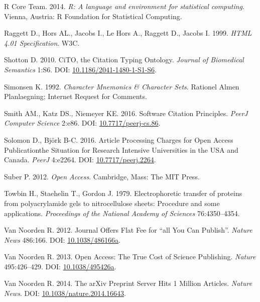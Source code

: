 \documentclass[10pt,fleqn]{wlpeerj}
\begin{document}
\hypertarget{ref-Rux5f2014}{}
R Core Team. 2014. \emph{R: A language and environment for statistical
computing}. Vienna, Austria: R Foundation for Statistical Computing.

\hypertarget{ref-HTML4}{}
Raggett D., Hors AL., Jacobs I., Le Hors A., Raggett D., Jacobs I. 1999.
\emph{HTML 4.01 Specification}. W3C.

\hypertarget{ref-shottonux5fcitoux5f2010}{}
Shotton D. 2010. CiTO, the Citation Typing Ontology. \emph{Journal of
Biomedical Semantics} 1:S6. DOI:
\href{https://doi.org/10.1186/2041-1480-1-S1-S6}{10.1186/2041-1480-1-S1-S6}.

\hypertarget{ref-rfc1345}{}
Simonsen K. 1992. \emph{Character Mnemonics \& Character Sets}. Rationel
Almen Planlaegning; Internet Request for Comments.

\hypertarget{ref-smithux5fsoftwareux5f2016}{}
Smith AM., Katz DS., Niemeyer KE. 2016. Software Citation Principles.
\emph{PeerJ Computer Science} 2:e86. DOI:
\href{https://doi.org/10.7717/peerj-cs.86}{10.7717/peerj-cs.86}.

\hypertarget{ref-solomonux5farticleux5f2016}{}
Solomon D., Björk B-C. 2016. Article Processing Charges for Open Access
Publicationthe Situation for Research Intensive Universities in the USA
and Canada. \emph{PeerJ} 4:e2264. DOI:
\href{https://doi.org/10.7717/peerj.2264}{10.7717/peerj.2264}.

\hypertarget{ref-suberux5fopenux5f2012}{}
Suber P. 2012. \emph{Open Access}. Cambridge, Mass: The MIT Press.

\hypertarget{ref-towbinux5felectrophoreticux5f1979}{}
Towbin H., Staehelin T., Gordon J. 1979. Electrophoretic transfer of
proteins from polyacrylamide gels to nitrocellulose sheets: Procedure
and some applications. \emph{Proceedings of the National Academy of
Sciences} 76:4350--4354.

\hypertarget{ref-vanux5fnoordenux5fjournalux5f2012}{}
Van Noorden R. 2012. Journal Offers Flat Fee for ``all You Can
Publish''. \emph{Nature News} 486:166. DOI:
\href{https://doi.org/10.1038/486166a}{10.1038/486166a}.

\hypertarget{ref-vanux5fnoordenux5fopenux5f2013}{}
Van Noorden R. 2013. Open Access: The True Cost of Science Publishing.
\emph{Nature} 495:426--429. DOI:
\href{https://doi.org/10.1038/495426a}{10.1038/495426a}.

\hypertarget{ref-vanux5fnoordenux5farxivux5f2014}{}
Van Noorden R. 2014. The arXiv Preprint Server Hits 1 Million Articles.
\emph{Nature News}. DOI:
\href{https://doi.org/10.1038/nature.2014.16643}{10.1038/nature.2014.16643}.
\end{document}

